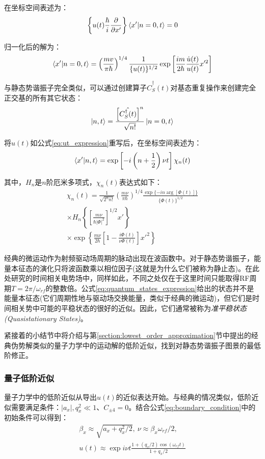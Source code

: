 在坐标空间表述为：
\begin{align}
    \left\{u(t)\frac{\hbar}{i}\frac{\partial}{\partial x'}\right\}\braket{x'|n=0,t}=0
\end{align}

归一化后的解为：
\begin{align}
    \braket{x'|n=0,t}=\left(\frac{mv}{\pi\hbar}\right)^{1/4}\frac{1}{\{u(t)\}^{1/2}}\exp\left[\frac{i m}{2\hbar}\frac{\dot{u}(t)}{u(t)}x'^2\right]
\end{align}

与静态势谐振子完全类似，可以通过创建算子$\hat{C}_S^\dagger(t)$对基态重复操作来创建完全正交基的所有其它状态：
\begin{align}
    \ket{n,t}=\frac{\left[\hat{C_S^\dagger(t)}\right]^n}{\sqrt{n!}}\ket{n=0,t}\label{eq:basic_sattes}
\end{align}

将$u(t)$如公式\eqref{eq:ut_expression}重写后，在坐标空间表述为：
\begin{align}
    \braket{x'|n,t}=\exp\left[-i\left(n+\frac{1}{2}\right)\nu t\right]\chi_n(t) \label{eq:quantum_states_expression}
\end{align}

其中，$H_n$是$n$阶厄米多项式，$\chi_n(t)$表达式如下：
\begin{align}
    \chi_n(t)=\frac{1}{\sqrt{2^n n!}}\left(\frac{m\nu}{\pi  \hbar}\right)^{1/4}
    \frac{\exp\{-i n \arg\left[\Phi(t)\right]\}}{\{\Phi(t)\}^{1/2}}\\
    \times H_n\left\{\left[\frac{m\nu}{\hbar|\Phi|^2}\right]^{1/2}x'\right\}\\
    \times \exp\left\{\frac{m\nu }{2\hbar}\left[1-\frac{i\Phi(t)}{\nu\Phi(t)}\right]x'^2\right\}
\end{align}

经典的微运动作为射频驱动场周期的脉动出现在波函数中。对于静态势谐振子，能量本征态的演化只将波函数乘以相位因子(这就是为什么它们被称为静止态)。在此处研究的时间相关电势场中，同样如此，不同之处仅在于这里时间只能取得RF周期$T=2\pi/\omega_{rf}$的整数倍。公式\ref{eq:quantum_states_expression}给出的状态并不是能量本征态(它们周期性地与驱动场交换能量，类似于经典的微运动)，但它们是时间相关势中可能的平稳状态的很好的近似。因此，它们通常被称为\emph{准平稳状态(Quasistationary States)}。

紧接着的小结节中将介绍与第\ref{section:lowest_order_approximation}节中提出的经典伪势解类似的量子力学中的运动解的低阶近似，找到对静态势谐振子图景的最低阶修正。


\subsubsection[量子低阶近似]{量子低阶近似}
量子力学中的低阶近似从导出$u(t)$的近似表达开始。与经典的情况类似，低阶近似需要满足条件：$|a_x|,q_x^2\ll 1$、$C_{\pm 4}=0$。结合公式\eqref{eq:boundary_condition}中的初始条件可以得到：
\begin{align}
    \beta_x\approx\sqrt{a_x+q_x^2/2},\ \nu\approx\beta_x\omega_{rf}/2,\\
    u(t)\approx\exp{i\nu t}\frac{1+(q_x/2)\cos(\omega_{rf}t)}{1+q_x/2}\label{eq:quantum_lowest_order_approximation}
\end{align}

